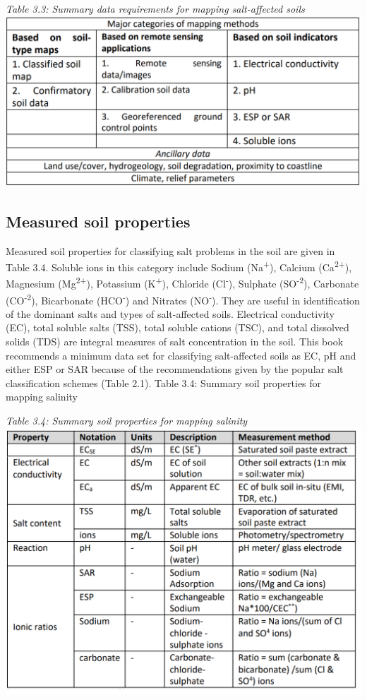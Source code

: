\documentclass[
  10pt,
  b5paper,
]{book}
\begin{document}
\emph{Table 3.3: Summary data requirements for mapping salt-affected soils}
\includegraphics{figures/tables/Table_3.3.PNG}

\hypertarget{measured-soil-properties}{%
\subsection{Measured soil properties}\label{measured-soil-properties}}

Measured soil properties for classifying salt problems in the soil are given in Table 3.4. Soluble ions in this category include Sodium (Na\textsuperscript{+}), Calcium (Ca\textsuperscript{2+}), Magnesium (Mg\textsuperscript{2+}), Potassium (K\textsuperscript{+}), Chloride (Cl\textsuperscript{-}), Sulphate (SO\textsuperscript{-2}), Carbonate (CO\textsuperscript{-2}), Bicarbonate (HCO\textsuperscript{-}) and Nitrates (NO\textsuperscript{-}). They are useful in identification of the dominant salts and types of salt-affected soils. Electrical conductivity (EC), total soluble salts (TSS), total soluble cations (TSC), and total dissolved solids (TDS) are integral measures of salt concentration in the soil. This book recommends a minimum data set for classifying salt-affected soils as EC, pH and either ESP or SAR because of the recommendations given by the popular salt classification schemes (Table 2.1).
Table 3.4: Summary soil properties for mapping salinity

\emph{Table 3.4: Summary soil properties for mapping salinity}
\includegraphics{figures/tables/Table_3.4.PNG}
\end{document}
